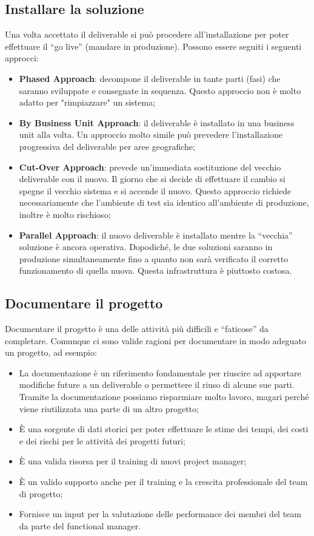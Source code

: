 \subsection{Installare la soluzione}
Una volta accettato il deliverable si può procedere all’installazione per poter effettuare il “go live” (mandare in produzione). Possono essere seguiti i seguenti approcci:
\begin{itemize}
	\item \textbf{Phased Approach}: decompone il deliverable in tante parti (fasi) che saranno sviluppate e consegnate in sequenza. Questo approccio non è molto adatto per "rimpiazzare" un sistema;
	\item \textbf{By Business Unit Approach}: il deliverable è installato in una business unit alla volta. Un approccio molto simile può prevedere l’installazione progressiva del deliverable per aree geografiche;
	\item \textbf{Cut-Over Approach}: prevede un’immediata sostituzione del vecchio deliverable con il nuovo. Il giorno che si decide di effettuare il cambio si spegne il vecchio sistema e si accende il nuovo. Questo approccio richiede necessariamente che l’ambiente di test sia identico all’ambiente di produzione, inoltre è molto rischioso;
	\item \textbf{Parallel Approach}: il nuovo deliverable è installato mentre la “vecchia” soluzione è ancora operativa. Dopodiché, le due soluzioni saranno in produzione simultaneamente fino a quanto non sarà verificato il corretto funzionamento di quella nuova. Questa infrastruttura è piuttosto costosa.
\end{itemize}
\subsection{Documentare il progetto}
Documentare il progetto è una delle attività più difficili e “faticose” da completare. Comunque ci sono valide ragioni per documentare in modo adeguato un progetto, ad esempio:
\begin{itemize}
	\item La documentazione è un riferimento fondamentale per riuscire ad apportare modifiche future a un deliverable o permettere il riuso di alcune sue parti. Tramite la documentazione possiamo risparmiare molto lavoro, magari perché viene riutilizzata una parte di un altro progetto;
	\item È una sorgente di dati storici per poter effettuare le stime dei tempi, dei costi e dei rischi per le attività dei progetti futuri;
	\item È una valida risorsa per il training di nuovi project manager;
	\item È un valido supporto anche per il training e la crescita professionale del team di progetto;
	\item Fornisce un input per la valutazione delle performance dei membri del team da parte del functional manager.
\end{itemize}
